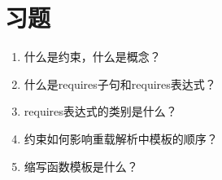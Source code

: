 \section{习题}
\begin{enumerate}
  \item 什么是约束，什么是概念？
  \item 什么是requires子句和requires表达式？
  \item requires表达式的类别是什么？
  \item 约束如何影响重载解析中模板的顺序？
  \item 缩写函数模板是什么？
\end{enumerate}